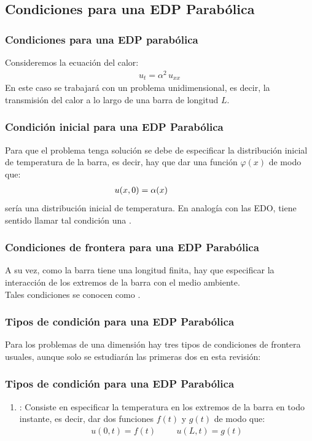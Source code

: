 \documentclass[12pt]{beamer}
\begin{document}
\subsection{Condiciones para una EDP Parabólica}

\begin{frame}
\frametitle{Condiciones para una EDP parabólica}
Consideremos la ecuación del calor:
\pause
\begin{align*}
u_{t} =  \alpha^{2} \,  u_{xx}
\end{align*}
En este caso se trabajará con un problema unidimensional, es decir, la transmisión del calor a lo largo de una barra de longitud $L$.
\end{frame}
\begin{frame}
\frametitle{Condición inicial para una EDP Parabólica}
Para que el problema tenga solución se debe de especificar la distribución inicial de temperatura de la barra, es decir, hay que dar una función $\varphi (x)$ de modo que:
\pause
\begin{align}
u (x, 0) = \alpha (x) \hspace{1.5cm} 
\label{eq:ecuacion_06_02_02}
\end{align}
sería una distribución inicial de temperatura. \pause En analogía con las EDO, tiene sentido llamar tal condición una .
\end{frame}
\begin{frame}
\frametitle{Condiciones de frontera para una EDP Parabólica}
A su vez, como la barra tiene una longitud finita, hay que especificar la interacción de los extremos de la barra con el medio ambiente.
\\
\bigskip
\pause
Tales condiciones se conocen como .
\end{frame}
\begin{frame}
\frametitle{Tipos de condición para una EDP Parabólica}
Para los problemas de una dimensión hay tres tipos de condiciones de frontera usuales, aunque solo se estudiarán las primeras dos en esta revisión:
\end{frame}
\begin{frame}
\frametitle{Tipos de condición para una EDP Parabólica}
\begin{enumerate}[<+->]
\item {}: Consiste en especificar la temperatura en los extremos de la barra en todo instante, es decir, dar dos funciones $f(t)$ y $g(t)$ de modo que:
\begin{align}
u(0, t) = f (t)  \hspace{1cm} u(L, t) = g(t)
\label{eq:ecuacion_06_02_03}    
\end{align}
\seti
\end{enumerate}
\end{frame}
\end{document}
